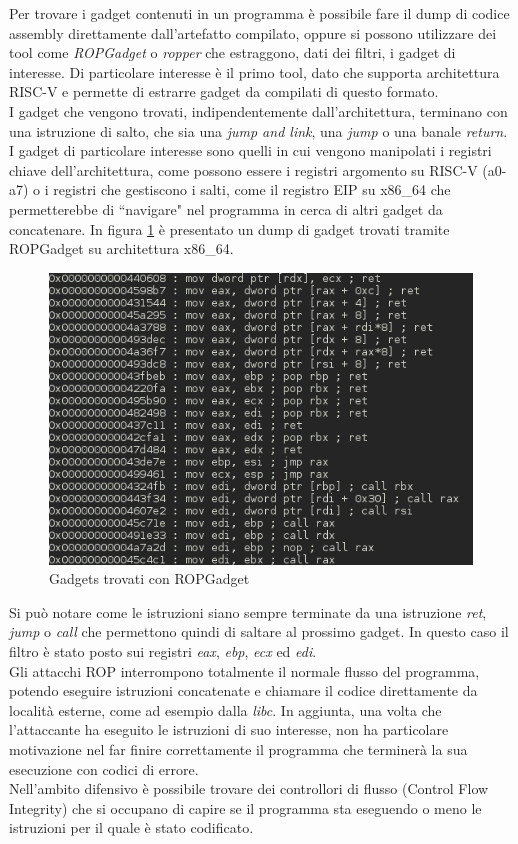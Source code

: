 Per trovare i gadget contenuti in un programma è possibile fare il dump di codice assembly direttamente dall'artefatto compilato, oppure si possono utilizzare dei tool come \textit{ROPGadget} \cite{GithubROP} o \textit{ropper} \cite{GithubRopper} che estraggono, dati dei filtri, i gadget di interesse. Di particolare interesse è il primo tool, dato che supporta architettura RISC-V e permette di estrarre gadget da compilati di questo formato. \\
I gadget che vengono trovati, indipendentemente dall'architettura, terminano con una istruzione di salto, che sia una \textit{jump and link}, una \textit{jump} o una banale \textit{return}. I gadget di particolare interesse sono quelli in cui vengono manipolati i registri chiave dell'architettura, come possono essere i registri argomento su RISC-V (a0-a7) o i registri che gestiscono i salti, come il registro EIP su x86\_64 che permetterebbe di ``navigare" nel programma in cerca di altri gadget da concatenare. In figura \ref{ref:gadgetx86} è presentato un dump di gadget trovati tramite ROPGadget su architettura x86\_64.
\vspace{1cm}
\FloatBarrier
\begin{figure}[!htbp]
    \centering
    \includegraphics[width=0.8\linewidth]{images/x86gadgets.png}
    \caption{Gadgets trovati con ROPGadget}
    \label{ref:gadgetx86}
\end{figure}
\FloatBarrier
\vspace{1cm}
Si può notare come le istruzioni siano sempre terminate da una istruzione \textit{ret}, \textit{jump} o \textit{call} che permettono quindi di saltare al prossimo gadget. In questo caso il filtro è stato posto sui registri \textit{eax}, \textit{ebp}, \textit{ecx} ed \textit{edi}.\\
\newline
Gli attacchi ROP interrompono totalmente il normale flusso del programma, potendo eseguire istruzioni concatenate e chiamare il codice direttamente da località esterne, come ad esempio dalla \textit{libc}. In aggiunta, una volta che l'attaccante ha eseguito le istruzioni di suo interesse, non ha particolare motivazione nel far finire correttamente il programma che terminerà la sua esecuzione con codici di errore. \\
\newline
Nell'ambito difensivo è possibile trovare dei controllori di flusso (Control Flow Integrity) che si occupano di capire se il programma sta eseguendo o meno le istruzioni per il quale è stato codificato. 
